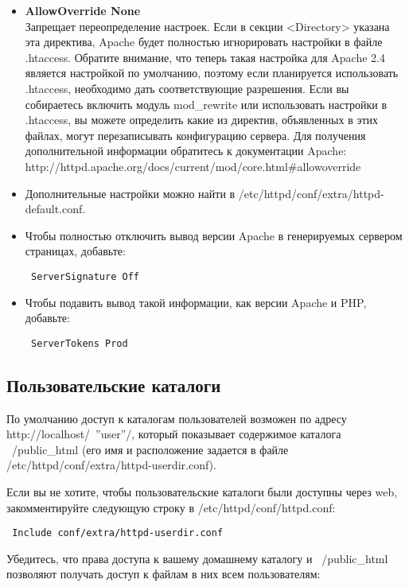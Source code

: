 \documentclass[a4paper,10pt,twoside]{article}
\begin{document}
\begin{itemize}
\item \textbf{AllowOverride None}\\
Запрещает переопределение настроек. Если в секции <Directory> указана эта директива, Apache будет полностью игнорировать настройки в файле .htaccess. Обратите внимание, что теперь такая настройка для Apache 2.4 является настройкой по умолчанию, поэтому если планируется использовать .htaccess, необходимо дать соответствующие разрешения. Если вы собираетесь включить модуль mod\_rewrite или использовать настройки в .htaccess, вы можете определить какие из директив, объявленных в этих файлах, могут перезаписывать конфигурацию сервера. Для получения дополнительной информации обратитесь к документации Apache: http://httpd.apache.org/docs/current/mod/core.html\#allowoverride 
\item Дополнительные настройки можно найти в /etc/httpd/conf/extra/httpd-default.conf.
\item Чтобы полностью отключить вывод версии Apache в генерируемых сервером страницах, добавьте:\\
\begin{verbatim}
 ServerSignature Off
\end{verbatim} 
\item Чтобы подавить вывод такой информации, как версии Apache и PHP, добавьте:
\begin{verbatim}
 ServerTokens Prod
\end{verbatim} 
\end{itemize}


\subsection{Пользовательские каталоги}
По умолчанию доступ к каталогам пользователей возможен по адресу http://localhost/~''user''/, который показывает содержимое каталога ~/public\_html (его имя и расположение задается в файле /etc/httpd/conf/extra/httpd-userdir.conf).

Если вы не хотите, чтобы пользовательские каталоги были доступны через web, закомментируйте следующую строку в /etc/httpd/conf/httpd.conf:
\begin{verbatim}
 Include conf/extra/httpd-userdir.conf
\end{verbatim} 
Убедитесь, что права доступа к вашему домашнему каталогу и ~/public\_html позволяют получать доступ к файлам в них всем пользователям:
\end{document}

